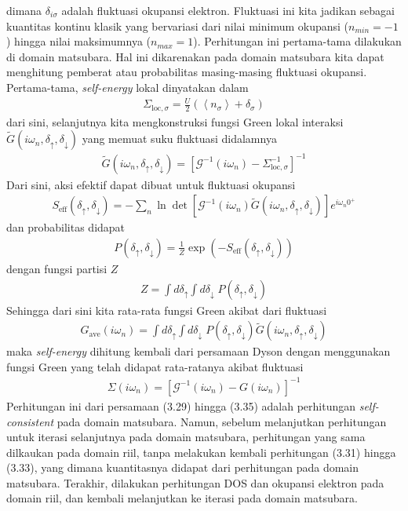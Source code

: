 dimana $\delta_{i\sigma}$ adalah fluktuasi okupansi elektron. Fluktuasi ini kita jadikan sebagai kuantitas kontinu klasik yang bervariasi dari nilai minimum okupansi ($n_{min} = -1$) hingga nilai maksimumnya ($n_{max} = 1$). Perhitungan ini pertama-tama dilakukan di domain matsubara. Hal ini dikarenakan pada domain matsubara kita dapat menghitung pemberat atau probabilitas masing-masing fluktuasi okupansi. Pertama-tama, \textit{self-energy} lokal dinyatakan dalam
\begin{align}
\Sigma_{\text{loc},\sigma} = \frac{U}{2}\left(\left< n_\sigma \right> + \delta_\sigma\right) 
\end{align}
dari sini, selanjutnya kita mengkonstruksi fungsi Green lokal interaksi $\tilde{G}(i\omega_n, \delta_{\uparrow}, \delta_{\downarrow})$ yang memuat suku fluktuasi didalamnya
\begin{align}
\tilde{G}(i\omega_n, \delta_{\uparrow}, \delta_{\downarrow}) = \left[ \mathcal{G}^{-1}(i\omega_n) - \Sigma_{\text{loc},\sigma}^{-1} \right]^{-1}
\end{align}
Dari sini, aksi efektif dapat dibuat untuk fluktuasi okupansi
\begin{align}
S_{\text{eff}}(\delta_\uparrow,\delta_\downarrow) = - \sum_n \ln \det \left[ \mathcal{G}^{-1}(i\omega_n) \tilde{G}(i\omega_n,\delta_\uparrow,\delta_\downarrow) \right] e^{i\omega_n 0^+}
\end{align}
dan probabilitas didapat
\begin{align}
P(\delta_\uparrow, \delta_\downarrow) = \frac{1}{Z} \exp(-S_{\text{eff}}(\delta_\uparrow,\delta_\downarrow))
\end{align}
dengan fungsi partisi $Z$
\begin{align}
Z = \int d\delta_\uparrow \int d\delta_\downarrow \; P(\delta_\uparrow, \delta_\downarrow)
\end{align}
Sehingga dari sini kita rata-rata fungsi Green akibat dari fluktuasi
\begin{align}
G_{\text{ave}}(i\omega_n) = \int d\delta_\uparrow \int d\delta_\downarrow \; P(\delta_\uparrow, \delta_\downarrow) \tilde{G}(i\omega_n, \delta_{\uparrow}, \delta_{\downarrow})
\end{align}
maka \textit{self-energy} dihitung kembali dari persamaan Dyson dengan menggunakan fungsi Green yang telah didapat rata-ratanya akibat fluktuasi
\begin{align}
\Sigma(i\omega_n) = \left[\mathcal{G}^{-1}(i\omega_n) - G(i\omega_n)\right]^{-1}
\end{align}
Perhitungan ini dari persamaan (3.29) hingga (3.35) adalah perhitungan \textit{self-consistent} pada domain matsubara. Namun, sebelum melanjutkan perhitungan untuk iterasi selanjutnya pada domain matsubara, perhitungan yang sama dilkaukan pada domain riil, tanpa melakukan kembali perhitungan (3.31) hingga (3.33), yang dimana kuantitasnya didapat dari perhitungan pada domain matsubara. Terakhir, dilakukan perhitungan DOS dan okupansi elektron pada domain riil, dan kembali melanjutkan ke iterasi pada domain matsubara.

